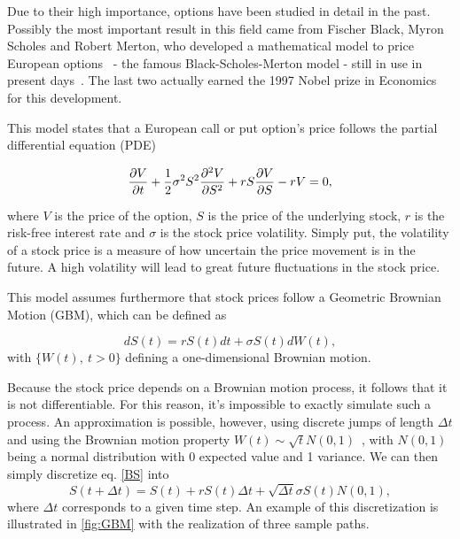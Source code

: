 \documentclass[a4paper,twocolumn,aps,prd,longbibliography,superscriptaddress]{revtex4-1}
\begin{document}
Due to their high importance, options have been studied in detail in the past.
Possibly the most important result in this field came from Fischer Black, Myron Scholes and Robert Merton, who developed a mathematical model to price European options~\cite{Scholes} - the famous Black-Scholes-Merton model - still in use in present days~\cite{Wilmott2}. The last two actually earned the 1997 Nobel prize in Economics for this development.

This model states that a European call or put option's price follows the partial differential equation (PDE)

\begin{equation}\label{BS2}
\pdv{V}{t}+\frac{1}{2}\sigma^2S^2\pdv{^2V}{S^2}+rS\pdv{V}{S}-rV=0,
\end{equation}

\noindent where $V$ is the price of the option, $S$ is the price of the underlying stock, $r$ is the risk-free interest rate and $\sigma$ is the stock price volatility.
Simply put, the volatility of a stock price is a measure of how uncertain the price movement is in the future. A high volatility will lead to great future fluctuations in the stock price.

This model assumes furthermore that stock prices follow a Geometric Brownian Motion (GBM), which can be defined as

\begin{equation}\label{BS}
dS(t)=rS(t)dt+\sigma S(t)dW(t),
\end{equation}
\noindent with $\{W(t),\ t>0\}$ defining a one-dimensional Brownian motion.

Because the stock price depends on a Brownian motion process, it follows that it is not differentiable. For this reason, it's impossible to exactly simulate such a process. An approximation is possible, however, using discrete jumps of length $\Delta t$ and using the Brownian motion property $W(t)\sim \sqrt{t}N(0,1)$~\cite{Mikosch}, with $N(0,1)$ being a normal distribution with 0 expected value and 1 variance.
We can then simply discretize eq. \eqref{BS} into
\begin{equation}
S(t+\Delta t)=S(t)+rS(t)\Delta t+\sqrt{\Delta t}\sigma S(t)N(0,1),
\end{equation}
\noindent where $\Delta t$ corresponds to a given time step. An example of this discretization is illustrated in \autoref{fig:GBM} with the realization of three sample paths.
\end{document}
